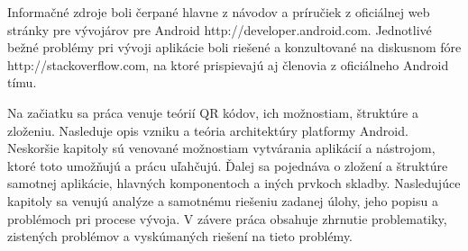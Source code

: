 	Informačné zdroje boli čerpané hlavne z návodov a príručiek z oficiálnej web stránky pre vývojárov pre Android http://developer.android.com. Jednotlivé bežné problémy pri vývoji aplikácie boli riešené a konzultované na diskusnom fóre http://stackoverflow.com, na ktoré prispievajú aj členovia z oficiálneho Android tímu.

	Na začiatku sa práca venuje teórií QR kódov, ich možnostiam, štruktúre a zloženiu. Nasleduje opis vzniku a teória architektúry platformy Android. Neskoršie kapitoly sú venované možnostiam vytvárania aplikácií a nástrojom, ktoré toto umožňujú a prácu uľahčujú. Ďalej sa pojednáva o zložení a štruktúre samotnej aplikácie, hlavných komponentoch	a iných prvkoch skladby. Nasledujúce kapitoly sa venujú analýze a samotnému riešeniu zadanej úlohy, jeho popisu a problémoch pri procese vývoja. V závere práca obsahuje zhrnutie problematiky, zistených problémov a vyskúmaných riešení na tieto problémy.
